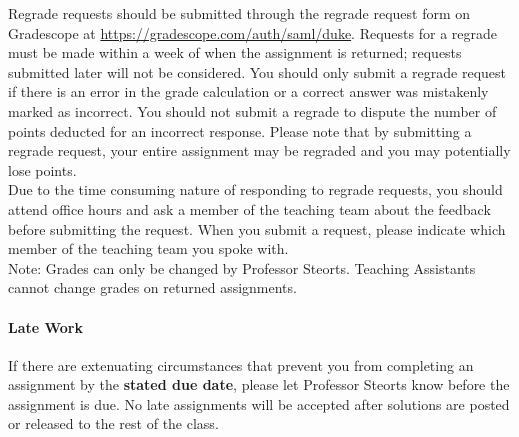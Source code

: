 \documentclass[11pt]{article}
\begin{document}
Regrade requests should be submitted through the regrade request form on Gradescope at \url{https://gradescope.com/auth/saml/duke}. Requests for a regrade must be made within a week of when the assignment is returned; requests submitted later will not be considered. You should only submit a regrade request if there is an error in the grade calculation or a correct answer was mistakenly marked as incorrect. You should not submit a regrade to dispute the number of points deducted for an incorrect response. Please note that by submitting a regrade request, your entire assignment may be regraded and you may potentially lose points.\\

Due to the time consuming nature of responding to regrade requests, you should attend office hours and ask a member of the teaching team about the feedback before submitting the request. When you submit a request, please indicate which member of the teaching team you spoke with. \\

Note: Grades can only be changed by Professor Steorts. Teaching Assistants cannot change grades on returned assignments.\\


\paragraph{Late Work} 

If there are extenuating circumstances that prevent you from completing an assignment by the \textbf{stated due date}, please let Professor Steorts know before the assignment is due. No late assignments will be accepted after solutions are posted or released to the rest of the class. 

\end{document}
